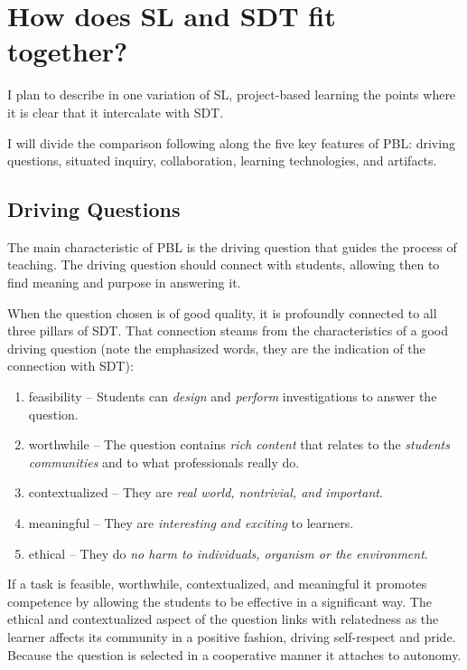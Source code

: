\section{How does SL and SDT fit together?}

I plan to describe in one variation of SL, project-based learning
the points where it is clear that it intercalate with SDT. 

I will divide the comparison following along the five key features of PBL:
driving questions, situated inquiry, collaboration, learning technologies, and
artifacts.\cite{education:joseph_phyllis__pbl}

\subsection{Driving Questions}

The main characteristic of PBL is the driving question that guides the process
of teaching. The driving question should connect with students, allowing then to
find meaning and purpose in answering it.

When the question chosen is of good quality, it is profoundly connected to
all three pillars of SDT. That connection steams from the characteristics of a
good driving question (note the emphasized words, they are the indication of the
connection with SDT):\cite{education:joseph_phyllis__pbl}

\begin{enumerate}
\item feasibility -- Students can \emph{design} and \emph{perform}
investigations to answer the question.

\item worthwhile -- The question contains \emph{rich content} that relates to
the \emph{students communities} and to what professionals really do.

\item contextualized -- They are \emph{real world, nontrivial, and important}.

\item meaningful -- They are \emph{interesting and exciting} to learners.

\item ethical -- They do \emph{no harm to individuals, organism or the
environment}.
\end{enumerate}

If a task is feasible, worthwhile, contextualized, and meaningful it promotes
competence by allowing the students to be effective in a significant way. The
ethical and contextualized aspect of the question links with relatedness as the
learner affects its community in a positive fashion, driving self-respect and
pride.  Because the question is selected in a cooperative manner
\cite{education:joseph_phyllis__pbl} it attaches to autonomy.

